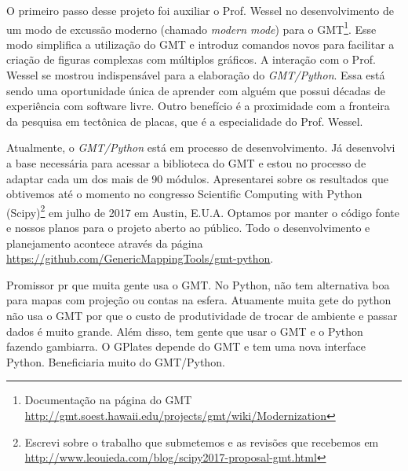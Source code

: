 O primeiro passo desse projeto foi auxiliar o Prof. Wessel no desenvolvimento
de um modo de excussão moderno (chamado \textit{modern mode}) para o
GMT\footnote{Documentação na página do GMT
\url{http://gmt.soest.hawaii.edu/projects/gmt/wiki/Modernization}}.
Esse modo simplifica a utilização do GMT e introduz comandos novos para
facilitar a criação de figuras complexas com múltiplos gráficos.
A interação com o Prof. Wessel se mostrou indispensável para a elaboração do
\textit{GMT/Python}.
Essa está sendo uma oportunidade única de aprender com alguém que possui
décadas de experiência com software livre.
Outro benefício é a proximidade com a fronteira da pesquisa em tectônica de
placas, que é a especialidade do Prof. Wessel.

Atualmente, o \textit{GMT/Python} está em processo de desenvolvimento.
Já desenvolvi a base necessária para acessar a biblioteca do GMT
e estou no processo de adaptar cada um dos mais de 90 módulos.
Apresentarei sobre os resultados que obtivemos até o momento no congresso
Scientific Computing with Python (Scipy)\footnote{Escrevi sobre o trabalho que
submetemos e as revisões que recebemos em
\url{http://www.leouieda.com/blog/scipy2017-proposal-gmt.html}} em julho de 2017 em Austin, E.U.A.
Optamos por manter o código fonte e nossos planos para o projeto aberto ao
público.
Todo o desenvolvimento e planejamento acontece através da página
\url{https://github.com/GenericMappingTools/gmt-python}.

Promissor pr que muita gente usa o GMT.
No Python, não tem alternativa boa para mapas com projeção  ou contas na
esfera.
Atuamente muita gete do python não usa o GMT por que o custo de produtividade
de trocar de
ambiente e passar dados é muito grande.
Além disso, tem gente que usar o GMT e o Python fazendo gambiarra.
O GPlates depende do GMT e tem uma nova interface Python.
Beneficiaria muito do GMT/Python.
